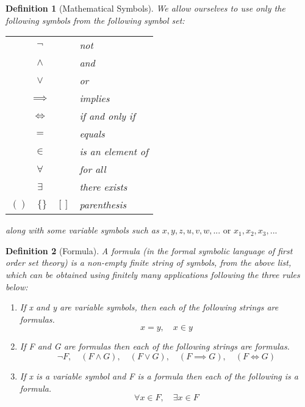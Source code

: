 \documentclass[11pt, oneside]{book}
\theoremstyle{break}
\newtheorem{defn}{Definition}[section]
\begin{document}
\begin{defn}[Mathematical Symbols]
	We allow ourselves to use only the following symbols from the following symbol set: \\
	\begin{center}
		\begin{tabular}{c l}
			$\neg$		&	not \\
			$\land$		&	and \\
			$\lor$		&	or \\
			$\implies$	&	implies \\
			$\iff$	&	if and only if \\
			$=$			&	equals \\
			$\in$		&	is an element of \\
			$\forall$	&	for all \\
			$\exists$	&	there exists \\
			$()\quad\{\}\quad[]$	&	parenthesis
		\end{tabular}
	\end{center}
	along with some variable symbols such as $x, y, z, u, v, w,... \text{ or } x_1, x_2, x_3,...$
\end{defn}

\begin{defn}[Formula]
	A formula (in the formal symbolic language of first order set theory) is a non-empty finite string of symbols, from the above list, which can be obtained using finitely many applications following the three rules below:
	\begin{enumerate}
		\item If x and y are variable symbols, then each of the following strings are formulas.
		\[
			x = y, \quad x \in y
		\]
		\item If F and G are formulas then each of the following strings are formulas.
		\[
			\neg F, \quad (F \land G), \quad (F \lor G), \quad (F \implies G), \quad (F \iff G)
		\]
		\item If x is a variable symbol and F is a formula then each of the following is a formula.
		\[
			\forall x \in F, \quad \exists x \in F
		\]
	\end{enumerate}
\end{defn}
\end{document}
